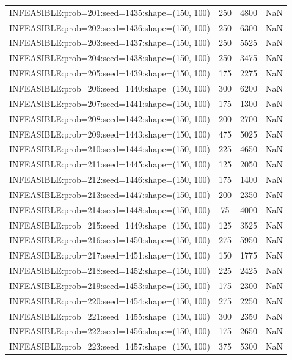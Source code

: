 \begin{longtable}{lccc}
INFEASIBLE:prob=201:seed=1435:shape=(150, 100) &      250 &  4800 &    NaN \\
INFEASIBLE:prob=202:seed=1436:shape=(150, 100) &      250 &  6300 &    NaN \\
INFEASIBLE:prob=203:seed=1437:shape=(150, 100) &      250 &  5525 &    NaN \\
INFEASIBLE:prob=204:seed=1438:shape=(150, 100) &      250 &  3475 &    NaN \\
INFEASIBLE:prob=205:seed=1439:shape=(150, 100) &      175 &  2275 &    NaN \\
INFEASIBLE:prob=206:seed=1440:shape=(150, 100) &      300 &  6200 &    NaN \\
INFEASIBLE:prob=207:seed=1441:shape=(150, 100) &      175 &  1300 &    NaN \\
INFEASIBLE:prob=208:seed=1442:shape=(150, 100) &      200 &  2700 &    NaN \\
INFEASIBLE:prob=209:seed=1443:shape=(150, 100) &      475 &  5025 &    NaN \\
INFEASIBLE:prob=210:seed=1444:shape=(150, 100) &      225 &  4650 &    NaN \\
INFEASIBLE:prob=211:seed=1445:shape=(150, 100) &      125 &  2050 &    NaN \\
INFEASIBLE:prob=212:seed=1446:shape=(150, 100) &      175 &  1400 &    NaN \\
INFEASIBLE:prob=213:seed=1447:shape=(150, 100) &      200 &  2350 &    NaN \\
INFEASIBLE:prob=214:seed=1448:shape=(150, 100) &       75 &  4000 &    NaN \\
INFEASIBLE:prob=215:seed=1449:shape=(150, 100) &      125 &  3525 &    NaN \\
INFEASIBLE:prob=216:seed=1450:shape=(150, 100) &      275 &  5950 &    NaN \\
INFEASIBLE:prob=217:seed=1451:shape=(150, 100) &      150 &  1775 &    NaN \\
INFEASIBLE:prob=218:seed=1452:shape=(150, 100) &      225 &  2425 &    NaN \\
INFEASIBLE:prob=219:seed=1453:shape=(150, 100) &      175 &  2300 &    NaN \\
INFEASIBLE:prob=220:seed=1454:shape=(150, 100) &      275 &  2250 &    NaN \\
INFEASIBLE:prob=221:seed=1455:shape=(150, 100) &      300 &  2350 &    NaN \\
INFEASIBLE:prob=222:seed=1456:shape=(150, 100) &      175 &  2650 &    NaN \\
INFEASIBLE:prob=223:seed=1457:shape=(150, 100) &      375 &  5300 &    NaN \\

\end{longtable}
